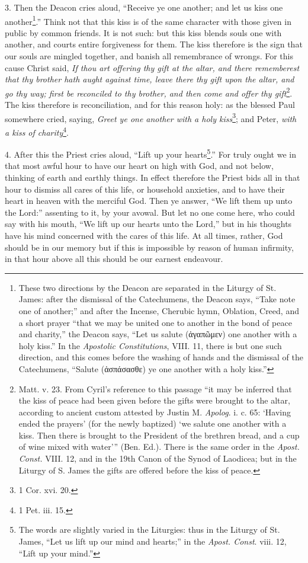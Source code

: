 3. Then the Deacon cries aloud, “Receive ye one another; and let us kiss one another\footnote{These two directions by the Deacon are separated in the Liturgy of St. James: after the dismissal of the Catechumens, the Deacon says, “Take note one of another;” and after the Incense, Cherubic hymn, Oblation, Creed, and a short prayer “that we may be united one to another in the bond of peace and charity,” the Deacon says, “Let us salute (\textgreek{ἀγαπῶμεν}) one another with a holy kiss.” In the \emph{Apostolic Constitutions}, VIII. 11, there is but one such direction, and this comes before the washing of hands and the dismissal of the Catechumens, “Salute (\textgreek{ἀσπάσασθε}) ye one another with a holy kiss.”}.” Think not that this kiss is of the same character with those given in public by common friends. It is not such: but this kiss blends souls one with another, and courts entire forgiveness for them. The kiss therefore is the sign that our souls are mingled together, and banish all remembrance of wrongs. For this cause Christ said, \emph{If thou art offering thy gift at the altar, and there rememberest that thy brother hath aught against time, leave there thy gift upon the altar, and go thy way; first be reconciled to thy brother, and then come and offer thy gift}\footnote{Matt. v. 23. From Cyril’s reference to this passage “it may be inferred that the kiss of peace had been given before the gifts were brought to the altar, according to ancient custom attested by Justin M. \emph{Apolog}. i. c. 65: ‘Having ended the prayers’ (for the newly baptized) ‘we salute one another with a kiss. Then there is brought to the President of the brethren bread, and a cup of wine mixed with water’” (Ben. Ed.). There is the same order in the \emph{Apost. Const.} VIII. 12, and in the 19th Canon of the Synod of Laodicea; but in the Liturgy of S. James the gifts are offered before the kiss of peace.}. The kiss therefore is reconciliation, and for this reason holy: as the blessed Paul somewhere cried, saying, \emph{Greet ye one another with a holy kiss}\footnote{1 Cor. xvi. 20.}; and Peter, \emph{with a kiss of charity}\footnote{1 Pet. iii. 15.}.

4. After this the Priest cries aloud, “Lift up your hearts\footnote{The words are slightly varied in the Liturgies: thus in the Liturgy of St. James, “Let us lift up our mind and hearts;” in the \emph{Apost. Const}. viii. 12, “Lift up your mind.”}.” For truly ought we in that most awful hour to have our heart on high with God, and not below, thinking of earth and earthly things. In effect therefore the Priest bids all in that hour to dismiss all cares of this life, or household anxieties, and to have their heart in heaven with the merciful God. Then ye answer, “We lift them up unto the Lord:” assenting to it, by your avowal. But let no one come here, who could say with his mouth, “We lift up our hearts unto the Lord,” but in his thoughts have his mind concerned with the cares of this life. At all times, rather, God should be in our memory but if this is impossible by reason of human infirmity, in that hour above all this should be our earnest endeavour.

